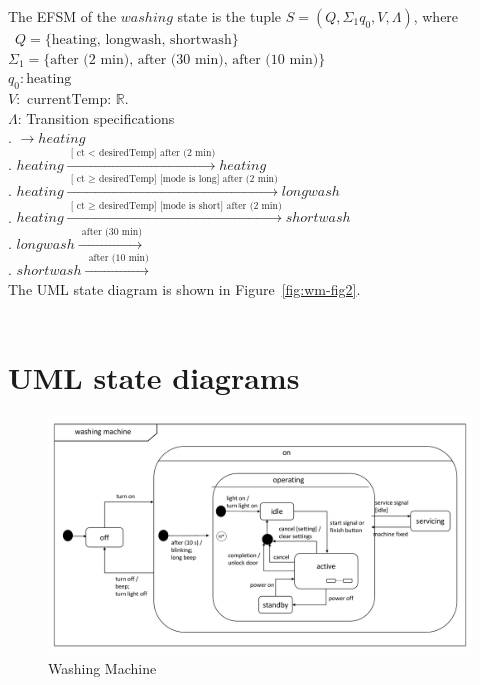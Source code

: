 \documentclass[12pt]{article}
\begin{document}
\begin{spacing}{1.5}
\noindent The EFSM of the $washing$ state is the tuple $S = (Q, \Sigma_1 q_0, V, \Lambda)$, where\\\
\noindent $Q = \{\text {heating, longwash, shortwash}\}$\\
\noindent $\Sigma_1 = \{\text {after (2 min), after (30 min), after (10 min)}\}$\\ 
\noindent $q_0: \text{heating}$\\
\noindent $V: \text{ currentTemp: } \mathbb{R}.$\\
\noindent $\Lambda$: Transition specifications\\
. $\xrightarrow {} heating$\\
. $heating \xrightarrow {\text { [ ct $<$ desiredTemp] after (2 min)}} heating $\\
\indent 3. $heating \xrightarrow {\text { [ ct $\geq$ desiredTemp] [mode is long] after (2 min)}}  longwash$\\
\indent 4. $heating \xrightarrow {\text { [ ct $\geq$ desiredTemp] [mode is short] after (2 min)}}  shortwash$\\
. $longwash  \xrightarrow {\text { after (30 min)}}$\\
\indent 5. $shortwash  \xrightarrow {\text { after (10 min)}}$\\

\noindent The UML state diagram is shown in Figure~\ref{fig:wm-fig2}.\\\\
\newpage

\section{UML state diagrams}

\begin{figure}[h!]
	\centering
		\includegraphics[page=1,width=1\textwidth]{./figures/updatedSecondDraft.pdf}
		  \caption{Washing Machine}
  \label{fig:wm-fig1}
\end{figure}


\end{spacing}
\end{document}
